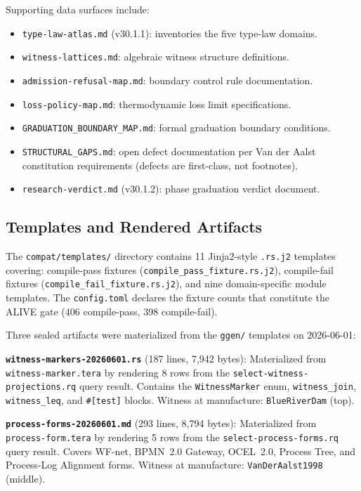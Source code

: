 Supporting data surfaces include:
\begin{itemize}
  \item \texttt{type-law-atlas.md} (v30.1.1): inventories the five type-law domains.
  \item \texttt{witness-lattices.md}: algebraic witness structure definitions.
  \item \texttt{admission-refusal-map.md}: boundary control rule documentation.
  \item \texttt{loss-policy-map.md}: thermodynamic loss limit specifications.
  \item \texttt{GRADUATION\_BOUNDARY\_MAP.md}: formal graduation boundary conditions.
  \item \texttt{STRUCTURAL\_GAPS.md}: open defect documentation per Van der Aalst
    constitution requirements (defects are first-class, not footnotes).
  \item \texttt{research-verdict.md} (v30.1.2): phase graduation verdict document.
\end{itemize}

\subsection{Templates and Rendered Artifacts}
\label{sec:sources-wasm4pm-compat-implementation-templates}

The \texttt{compat/templates/} directory contains 11 Jinja2-style \texttt{.rs.j2} templates
covering: compile-pass fixtures (\texttt{compile\_pass\_fixture.rs.j2}), compile-fail
fixtures (\texttt{compile\_fail\_fixture.rs.j2}), and nine domain-specific module templates.
The \texttt{config.toml} declares the fixture counts that constitute the ALIVE gate
(406 compile-pass, 398 compile-fail).

Three sealed artifacts were materialized from the \texttt{ggen/} templates on 2026-06-01:

\textbf{\texttt{witness-markers-20260601.rs}} (187 lines, 7{,}942 bytes): Materialized
from \texttt{witness-marker.tera} by rendering 8 rows from the
\texttt{select-witness-projections.rq} query result. Contains the \texttt{WitnessMarker}
enum, \texttt{witness\_join}, \texttt{witness\_leq}, and \texttt{\#[test]} blocks.
Witness at manufacture: \texttt{BlueRiverDam} (top).

\textbf{\texttt{process-forms-20260601.md}} (293 lines, 8{,}794 bytes): Materialized
from \texttt{process-form.tera} by rendering 5 rows from the
\texttt{select-process-forms.rq} query result. Covers WF-net, BPMN~2.0 Gateway,
OCEL~2.0, Process Tree, and Process-Log Alignment forms.
Witness at manufacture: \texttt{VanDerAalst1998} (middle).

